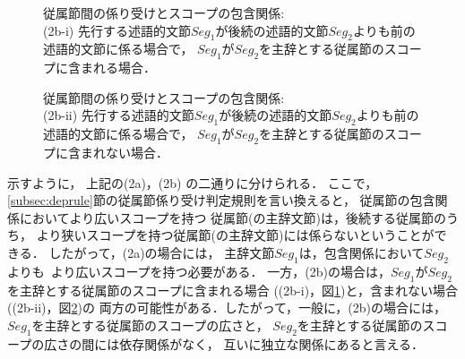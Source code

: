 \begin{figure}
   \hspace*{-1.5cm} 
\vspace{-3mm}
\begin{center}
  \caption{従属節間の係り受けとスコープの包含関係:\\ 
	(2b-i) 先行する述語的文節$Seg_1$が後続の述語的文節$Seg_2$よりも前の\\
	述語的文節に係る場合で，
	$Seg_1$が$Seg_2$を主辞とする従属節のスコープに含まれる場合．}
  \label{fig:rel2bi}
\end{center}
\end{figure}
\begin{figure}
   \hspace*{-1.5cm} 
\vspace{-12mm}
\begin{center}
  \caption{従属節間の係り受けとスコープの包含関係:\\ 
	(2b-ii) 先行する述語的文節$Seg_1$が後続の述語的文節$Seg_2$よりも前の\\
	述語的文節に係る場合で，
	$Seg_1$が$Seg_2$を主辞とする従属節のスコープに含まれない場合．}
  \label{fig:rel2bii}
\end{center}
\vspace{-6mm}
\end{figure}


 \noindent 示すように，
上記の(2a)，(2b)
の二通りに分けられる．
ここで，\ref{subsec:deprule}節の従属節係り受け判定規則を言い換えると，
従属節の包含関係においてより広いスコープを持つ
従属節(の主辞文節)は，後続する従属節のうち，
より狭いスコープを持つ従属節(の主辞文節)には係らないということができる．
したがって，(2a)の場合には，
主辞文節$Seg_1$は，包含関係において$Seg_2$より\mbox{も
より広い}スコープを持つ必要がある．
一方，(2b)の場合は，$Seg_1$が$Seg_2$\mbox{を主辞とする従属節}のスコープに含まれる場合
((2b-i)，図\ref{fig:rel2bi})と，含まれない場合((2b-ii)，図\ref{fig:rel2bii})の
両方の可能性がある．したがって，一般に，(2b)の場合には，
$Seg_1$を主辞とする従属節のスコープの広さと，
$Seg_2$を主辞とする従属節のスコープの広さの間には依存関係がなく，
互いに独立な関係にあると言える．


